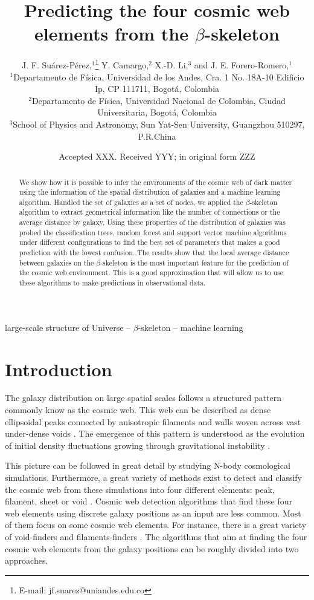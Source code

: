 \documentclass[usenatbib]{mnras}
\title[Cosmic web elements and the $\beta$-skeleton]{Predicting the four cosmic web
  elements from the $\beta$-skeleton}
\author[J. F. Su\'arez-P\'erez et al.]{
J. F. Su\'arez-P\'erez,$^{1}$\thanks{E-mail: jf.suarez@uniandes.edu.co}
Y. Camargo,$^{2}$ 
X.-D. Li,$^{3}$
and J. E. Forero-Romero,$^{1}$
\\
$^{1}$Departamento de F\'isica, Universidad de los Andes, Cra. 1 No. 18A-10 Edificio Ip, CP 111711, Bogot\'a, Colombia\\
$^{2}$Departamento de F\'isica, Universidad Nacional de Colombia, Ciudad Universitaria, Bogot\'a, Colombia\\
$^{3}$School of Physics and Astronomy, Sun Yat-Sen University, Guangzhou 510297, P.R.China\\
}
\date{Accepted XXX. Received YYY; in original form ZZZ}
\begin{document}
\label{firstpage}
\pagerange{\pageref{firstpage}--\pageref{lastpage}}
\maketitle

\begin{abstract}
We show how it is possible to infer the environments of the cosmic web
of dark matter using the information of the spatial distribution of
galaxies and a machine learning algorithm. 
Handled the set of galaxies as a set of nodes, we applied the
$\beta$-skeleton algorithm to extract geometrical information like the
number of connections or the average distance by galaxy. 
Using these properties of the distribution of galaxies was probed the
classification trees, random forest and support vector machine algorithms under different
configurations to find the best set of parameters that makes a good
prediction with the lowest confusion.  
The results show that the local average distance between galaxies on
the $\beta$-skeleton is the most important feature for the prediction
of the cosmic web environment. 
This is a good approximation that will allow us to use these
algorithms to make predictions in observational data.  
\end{abstract}

\begin{keywords}
large-scale structure of Universe -- $\beta$-skeleton -- machine learning
\end{keywords}


\section{Introduction}
The galaxy distribution on large spatial scales follows a structured 
pattern commonly know as the cosmic web. 
This web can be described as dense ellipsoidal peaks connected by
anisotropic filaments and walls woven across vast under-dense voids
\citep{Bond1996}. 
The emergence of this pattern is understood as the evolution of
initial density fluctuations growing through gravitational instability
\citep{ZelDovich1970,White1987}.   

This picture can be followed in great detail by studying N-body
cosmological simulations.   
Furthermore, a great variety of methods exist to detect and
classify the cosmic web from these simulations into four different 
elements: peak, filament, sheet or void \citep{Libeskind2018}.  
Cosmic web detection algorithms that find these four web
elements using discrete galaxy positions as an input are less
common. 
Most of them focus on some cosmic web elements.
For instance, there is a great variety of void-finders
\citep{Platen2007,Neyrinck2008} and filaments-finders
\citep{Novikov2003,Zhang2009,Sousbie2010,Chen2015,Luber2019}.   
The algorithms that aim at finding the four cosmic web elements from
the galaxy positions can be roughly divided into two approaches.
\end{document}
